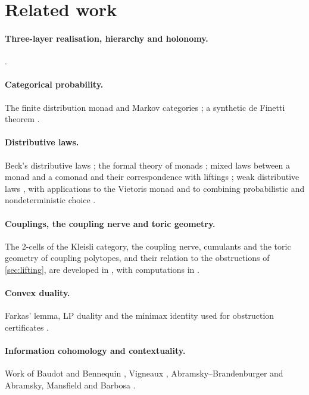 \documentclass[11pt]{article}
\theoremstyle{definition}
\theoremstyle{remark}
\begin{document}
\section{Related work}

\paragraph{Three-layer realisation, hierarchy and holonomy.}
\cite{Awasthi-ThreeLayers,Awasthi-Hierarchy,Awasthi-Holonomy}.
\paragraph{Categorical probability.} The finite distribution monad and Markov categories
\cite{Fritz2020,FGPR2023}; a synthetic de Finetti theorem \cite{FGP2021}.
\paragraph{Distributive laws.} Beck's distributive laws \cite{Beck1969}; the formal theory of monads
\cite{Street1972}; mixed laws between a monad and a comonad and their correspondence with liftings
\cite{PowerWatanabe2002}; weak distributive
laws \cite{Street2009,Bohm2010,BohmLackStreet2011}, with applications to the Vietoris monad
\cite{Garner2020} and to combining probabilistic and nondeterministic choice \cite{GoyPetrisan2020}.
\paragraph{Couplings, the coupling nerve and toric geometry.} The 2-cells of the Kleisli category, the coupling
nerve, cumulants and the toric geometry of coupling polytopes, and their relation to the obstructions of
\cref{sec:lifting}, are developed in \cite{Conditionals}, with computations in \cite{Awasthi-Family}.
\paragraph{Convex duality.} Farkas' lemma, LP duality and the minimax identity used for
obstruction certificates \cite{Schrijver1986}.
\paragraph{Information cohomology and contextuality.} Work of Baudot and Bennequin \cite{BaudotBennequin2015},
Vigneaux \cite{Vigneaux2019}, Abramsky--Brandenburger \cite{AbramskyBrandenburger2011} and
Abramsky, Mansfield and Barbosa \cite{AbramskyMansfieldBarbosa2012}.
\end{document}
